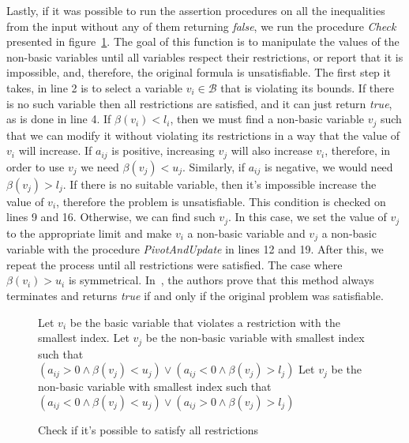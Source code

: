 Lastly, if it was possible to run the assertion procedures on all the inequalities from the input without any of them returning \textit{false}, we run the procedure \textit{Check} presented in figure~\ref{check_lra}. The goal of this function is to manipulate the values of the non-basic variables until all variables respect their restrictions, or report that it is impossible, and, therefore, the original formula is unsatisfiable. The first step it takes, in line 2 is to select a variable $v_{i} \in \mathcal{B}$ that is violating its bounds. If there is no such variable then all restrictions are satisfied, and it can just return \textit{true}, as is done in line 4. If $\beta(v_{i}) < l_{i}$, then we must find a non-basic variable $v_{j}$ such that we can modify it without violating its restrictions in a way that the value of $v_{i}$ will increase. If $a_{ij}$ is positive, increasing $v_{j}$ will also increase $v_{i}$, therefore, in order to use $v_{j}$ we need $\beta(v_{j}) < u_{j}$. Similarly, if $a_{ij}$ is negative, we would need $\beta(v_{j}) > l_{j}$. If there is no suitable variable, then it's impossible increase the value of $v_{i}$, therefore the problem is unsatisfiable. This condition is checked on lines 9 and 16. Otherwise, we can find such $v_{j}$. In this case, we set the value of $v_{j}$ to the appropriate limit and make $v_{i}$ a non-basic variable and $v_{j}$ a non-basic variable with the procedure \textit{PivotAndUpdate} in lines 12 and 19. After this, we repeat the process until all restrictions were satisfied. The case where $\beta(v_{i}) > u_{i}$ is symmetrical. In~\cite{simplex_dpllt}, the authors prove that this method always terminates and returns \textit{true} if and only if the original problem was satisfiable.

\begin{figure}[t]
\begin{algorithmic}[1]
    \State Let $v_{i}$ be the basic variable that violates a restriction with the smallest index.
      \State {}
    \EndIf
      \State Let $v_{j}$ be the non-basic variable with smallest index such that\\
      \qquad \qquad $(a_{ij} > 0 \wedge \beta(v_{j}) < u_{j}) \vee (a_{ij} < 0 \wedge \beta(v_{j}) > l_{j})$
        \State {}
      \EndIf
      \State {}
        \State Let $v_{j}$ be the non-basic variable with smallest index such that\\
        \qquad \qquad $(a_{ij} < 0 \wedge \beta(v_{j}) < u_{j}) \vee (a_{ij} > 0 \wedge \beta(v_{j}) > l_{j})$
          \State {}
        \EndIf
        \State {}
    \EndIf
    \State {}
  \EndFunction

\end{algorithmic}
\caption{Check if it's possible to satisfy all restrictions}\label{check_lra}
\end{figure}

